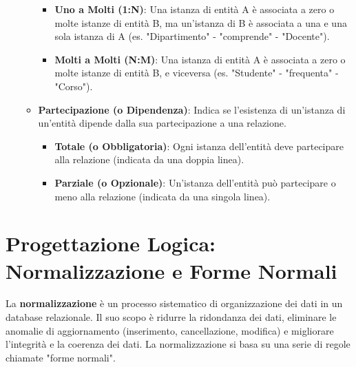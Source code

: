 \begin{itemize}
\begin{itemize}
\begin{itemize}
            \item \textbf{Uno a Molti (1:N)}: Una istanza di entità A è associata a zero o molte istanze di entità B, ma un'istanza di B è associata a una e una sola istanza di A (es. "Dipartimento" - "comprende" - "Docente").
            \item \textbf{Molti a Molti (N:M)}: Una istanza di entità A è associata a zero o molte istanze di entità B, e viceversa (es. "Studente" - "frequenta" - "Corso").
        \end{itemize}
        \item \textbf{Partecipazione (o Dipendenza)}: Indica se l'esistenza di un'istanza di un'entità dipende dalla sua partecipazione a una relazione.
        \begin{itemize}
            \item \textbf{Totale (o Obbligatoria)}: Ogni istanza dell'entità deve partecipare alla relazione (indicata da una doppia linea).
            \item \textbf{Parziale (o Opzionale)}: Un'istanza dell'entità può partecipare o meno alla relazione (indicata da una singola linea).
        \end{itemize}
    \end{itemize}
\end{itemize}

\section{Progettazione Logica: Normalizzazione e Forme Normali}
La \textbf{normalizzazione} è un processo sistematico di organizzazione dei dati in un database relazionale. Il suo scopo è ridurre la ridondanza dei dati, eliminare le anomalie di aggiornamento (inserimento, cancellazione, modifica) e migliorare l'integrità e la coerenza dei dati. La normalizzazione si basa su una serie di regole chiamate "forme normali".

